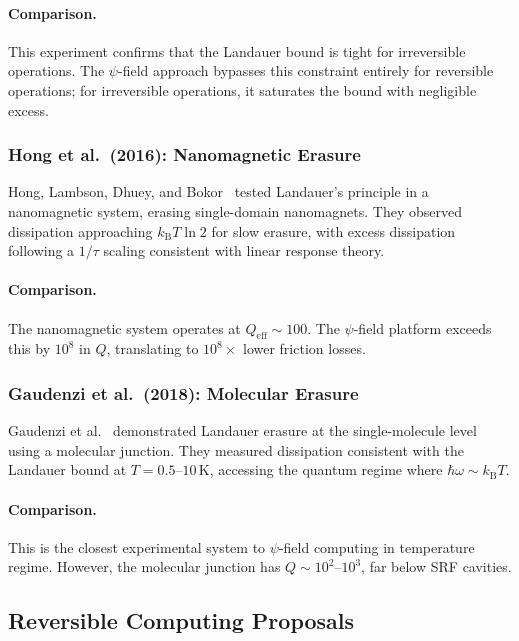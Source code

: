 \documentclass[11pt,twocolumn]{article}
\theoremstyle{definition}
\theoremstyle{remark}
\newcommand{\kB}{k_{\mathrm{B}}}
\begin{document}
\paragraph{Comparison.} This experiment confirms that the Landauer bound
is tight for irreversible operations. The $\psi$-field approach bypasses
this constraint entirely for reversible operations; for irreversible
operations, it saturates the bound with negligible excess.

\subsubsection{Hong et al.\ (2016): Nanomagnetic Erasure}

Hong, Lambson, Dhuey, and Bokor~\cite{Hong2016} tested Landauer's
principle in a nanomagnetic system, erasing single-domain
nanomagnets. They observed dissipation approaching $\kB T\ln 2$ for
slow erasure, with excess dissipation following a $1/\tau$ scaling
consistent with linear response theory.

\paragraph{Comparison.} The nanomagnetic system operates at $Q_{\mathrm{eff}}
\sim 100$. The $\psi$-field platform exceeds this by $10^8$ in $Q$,
translating to $10^8\times$ lower friction losses.

\subsubsection{Gaudenzi et al.\ (2018): Molecular Erasure}

Gaudenzi et al.~\cite{Gaudenzi2018} demonstrated Landauer erasure at
the single-molecule level using a molecular junction. They measured
dissipation consistent with the Landauer bound at $T = 0.5$--$10\,
\mathrm{K}$, accessing the quantum regime where $\hbar\omega \sim \kB T$.

\paragraph{Comparison.} This is the closest experimental system to
$\psi$-field computing in temperature regime. However, the molecular
junction has $Q \sim 10^2$--$10^3$, far below SRF cavities.

\subsection{Reversible Computing Proposals}
\end{document}
